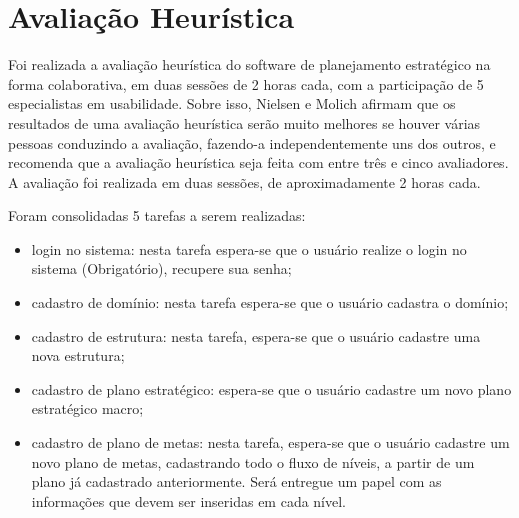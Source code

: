 



\section{Avaliação Heurística}

Foi realizada a avaliação heurística do software de planejamento estratégico na forma colaborativa, em duas sessões de 2 horas cada, com a participação de 5 especialistas em usabilidade. Sobre isso, Nielsen e Molich  \cite{Nielsen:1990:HEU:97243.97281} afirmam que os resultados de uma avaliação heurística serão muito melhores se houver várias pessoas conduzindo a avaliação, fazendo-a independentemente uns dos outros, e recomenda que a avaliação heurística seja feita com entre três e cinco avaliadores. A avaliação foi realizada em duas sessões, de aproximadamente 2 horas cada.
 

Foram consolidadas 5 tarefas a serem realizadas:

\begin{itemize}
\item login no sistema: nesta tarefa espera-se que o usuário realize o login no sistema (Obrigatório), recupere sua senha;
\item cadastro de domínio: nesta tarefa espera-se que o usuário cadastra o domínio;
\item cadastro de estrutura: nesta tarefa, espera-se que o usuário cadastre uma nova estrutura;
\item cadastro de plano estratégico: espera-se que o usuário cadastre um novo plano estratégico macro;
\item cadastro de plano de metas: nesta tarefa, espera-se que o usuário cadastre um novo plano de metas, cadastrando todo o fluxo de níveis,  a partir de um plano já cadastrado anteriormente. Será entregue um papel com as informações que devem ser inseridas em cada nível.
\end{itemize}

